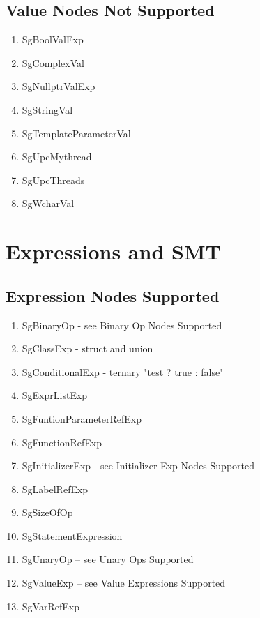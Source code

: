 \documentclass[11pt]{article}
\begin{document}
{\begin{enumeration}
\subsection{Value Nodes Not Supported}
\begin{enumerate}
\item SgBoolValExp
\item SgComplexVal
\item SgNullptrValExp
\item SgStringVal
\item SgTemplateParameterVal
\item SgUpcMythread
\item SgUpcThreads
\item SgWcharVal
\end{enumerate}

\section{Expressions and SMT}
\subsection{Expression Nodes Supported}
\begin{enumerate}
\item SgBinaryOp - see Binary Op Nodes Supported
\item SgClassExp - struct and union
\item SgConditionalExp - ternary "test ? true : false"
\item SgExprListExp 
\item SgFuntionParameterRefExp
\item SgFunctionRefExp
\item SgInitializerExp - see Initializer Exp Nodes Supported
\item SgLabelRefExp
\item SgSizeOfOp
\item SgStatementExpression
\item SgUnaryOp -- see Unary Ops Supported
\item SgValueExp -- see Value Expressions Supported
\item SgVarRefExp 

\end{enumerate}


\end{enumeration}}
\end{document}
